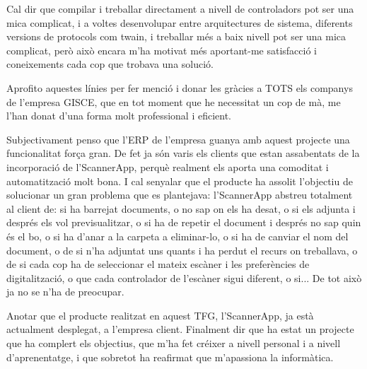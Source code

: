 \documentclass[letterpaper,11pt,catalan]{sphinxmanual}
\begin{document}
Cal dir que compilar i treballar directament a nivell de controladors pot ser una mica
complicat, i a voltes desenvolupar entre arquitectures de sistema, diferents versions de protocols
com twain, i treballar més a baix nivell pot ser una mica complicat, però això encara m'ha motivat
més aportant-me satisfacció i coneixements cada cop que trobava una solució.

Aprofito aquestes línies per fer menció i donar les gràcies a TOTS els companys de l'empresa GISCE, que en tot moment que he
necessitat un cop de mà, me l'han donat d'una forma molt professional i eficient.

Subjectivament penso que l'ERP de l'empresa guanya amb aquest projecte una funcionalitat força gran.
De fet ja són varis els clients que estan assabentats de la incorporació de l'ScannerApp, perquè realment
els aporta una comoditat i automatització molt bona. I cal senyalar que el producte ha assolit l'objectiu de solucionar un gran problema que es plantejava:
l'ScannerApp abstreu totalment al client de: si ha barrejat documents, o no sap on els ha desat, o si els adjunta i
després els vol previsualitzar, o si ha de repetir el document i després no sap quin és el bo, o
si ha d'anar a la carpeta a eliminar-lo, o si ha de canviar el nom del document, o de si n'ha
adjuntat uns quants i ha perdut el recurs on treballava, o de si cada cop ha de seleccionar el mateix escàner i
les preferències de digitalització, o que cada controlador de l'escàner sigui diferent, o si... De tot això ja
no se n'ha de preocupar.

Anotar que el producte realitzat en aquest TFG, l'ScannerApp, ja està actualment desplegat, a l'empresa client.
Finalment dir que ha estat un projecte que ha complert els objectius, que m'ha fet créixer a nivell personal i
a nivell d'aprenentatge, i que sobretot ha reafirmat que m'apassiona la informàtica.
\end{document}
